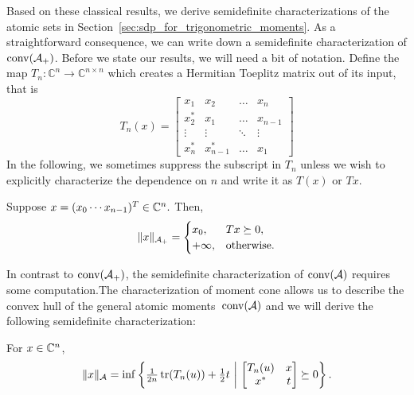 Based on these classical results, we derive semidefinite characterizations of
the atomic sets in Section~\ref{sec:sdp_for_trigonometric_moments}. As a
straightforward consequence, we can write down a semidefinite characterization
of $\operatorname{conv}(\mathcal{A}_+)$. Before we state our results, we will need a bit of notation.
Define the map $T_n:\mathbb{C}^n \rightarrow \mathbb{C}^{n\times n}$ which
creates a Hermitian Toeplitz matrix out of its input, that is
\[
T_n(x)= \left[
\begin{array}{ccccc} x_1 & x_2 & \ldots & x_n\\ 
x^*_2 & x_1  & \ldots & x_{n-1}\\
 \vdots & \vdots & \ddots & \vdots\\
 x^*_n & x^*_{n-1}  & \ldots & x_1
 \end{array}\right]
\]
In the following, we sometimes suppress the subscript in $T_n$ unless we wish to explicitly characterize the dependence on $n$ and write it as $T(x)$ or $T x$. 
\begin{theorem}
\label{thm:positive-linespect-sdp}
Suppose $x = (x_0 \cdots x_{n-1})^T \in \mathbb{C}^n.$ Then, 
	\[
		\lVert x\rVert_{\mathcal{A}_{+}} = \begin{cases}
			x_0, & T x \succeq 0,\\
			+\infty, & \text{otherwise.}
		\end{cases}
	\]
\end{theorem}
In contrast to $\operatorname{conv}(\mathcal{A}_+)$, the semidefinite characterization of $\operatorname{conv}(\mathcal{A})$
requires some computation.The characterization of moment cone allows us to
describe the convex hull of the general atomic moments~$\operatorname{conv}(\mathcal{A})$ and we will
derive the following semidefinite characterization:
\begin{theorem}\label{thm:sdp-char}
	For $x\in \mathbb{C}^n$,
	\begin{equation}
	\label{eq:atomic_sdp}
	\|x\|_{\mathcal{A}} = \inf\left\{ \tfrac{1}{2n} \operatorname{tr}( T_n(u)) +\tfrac{1}{2} t ~\middle|~ \begin{bmatrix}
T_n(u) & x\\
x^* & t
\end{bmatrix} \succeq 0 \right\}.
	\end{equation}
\end{theorem}

